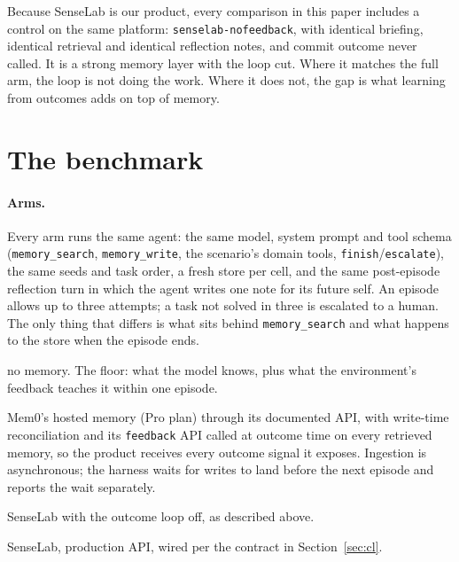 \documentclass[11pt]{article}
\newcommand{\arm}[1]{\texttt{#1}}
\begin{document}
Because SenseLab is our product, every comparison in this paper includes a control on the same
platform: \arm{senselab-nofeedback}, with identical briefing, identical retrieval and identical
reflection notes, and commit outcome never called. It is a strong memory layer with the loop
cut. Where it matches the full arm, the loop is not doing the work. Where it does not, the gap
is what learning from outcomes adds on top of memory.

\section{The benchmark}
\label{sec:design}

\paragraph{Arms.} Every arm runs the same agent: the same model, system prompt and tool schema
(\texttt{memory\_search}, \texttt{memory\_write}, the scenario's domain tools,
\texttt{finish}/\texttt{escalate}), the same seeds and task order, a fresh store per cell, and
the same post-episode reflection turn in which the agent writes one note for its future self.
An episode allows up to three attempts; a task not solved in three is escalated to a human. The
only thing that differs is what sits behind \texttt{memory\_search} and what happens to the
store when the episode ends.

\begin{description}[leftmargin=1.6em, itemsep=2pt]
\item[\arm{none}] no memory. The floor: what the model knows, plus what the environment's
  feedback teaches it within one episode.
\item[\arm{mem0}] Mem0's hosted memory (Pro plan) through its documented API, with write-time
  reconciliation and its \texttt{feedback} API called at outcome time on every retrieved
  memory, so the product receives every outcome signal it exposes. Ingestion is asynchronous;
  the harness waits for writes to land before the next episode and reports the wait separately.
\item[\arm{senselab-nofeedback}] SenseLab with the outcome loop off, as described above.
\item[\arm{senselab}] SenseLab, production API, wired per the contract in Section~\ref{sec:cl}.
\end{description}
\end{document}
